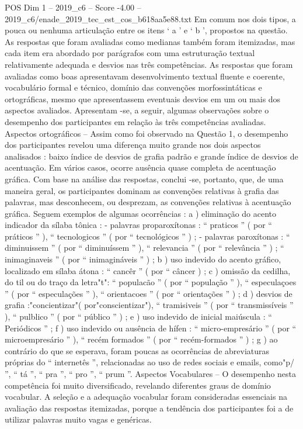 \begin{textsample}{POS Dim 1 – 2019\_c6 – Score -4.00 – 2019\_c6/enade\_2019\_tec\_est\_cos\_b618aa5e88.txt}
Em comum nos dois tipos, a pouca ou nenhuma articulação entre os itens ‘ a ’ e ‘ b ’, propostos na questão.
As respostas que foram avaliadas como medianas também foram itemizadas, mas cada item era abordado por parágrafos com uma estruturação textual relativamente adequada e desvios nas três competências.
As respostas que foram avaliadas como boas apresentavam desenvolvimento textual fluente e coerente, vocabulário formal e técnico, domínio das convenções morfossintáticas e ortográficas, mesmo que apresentassem eventuais desvios em um ou mais dos aspectos avaliados.
Apresentam -se, a seguir, algumas observações sobre o desempenho dos participantes em relação às três competências avaliadas.
Aspectos ortográficos – Assim como foi observado na Questão 1, o desempenho dos participantes revelou uma diferença muito grande nos dois aspectos analisados : baixo índice de desvios de grafia padrão e grande índice de desvios de acentuação.
Em vários casos, ocorre ausência quase completa de acentuação gráfica.
Com base na análise das respostas, conclui -se, portanto, que, de uma maneira geral, os participantes dominam as convenções relativas à grafia das palavras, mas desconhecem, ou desprezam, as convenções relativas à acentuação gráfica.
Seguem exemplos de algumas ocorrências : a ) eliminação do acento indicador da sílaba tônica : - palavras proparoxítonas : “ praticos ” ( por “ práticos ” ), “ tecnologicos ” ( por “ tecnológicos ” ) ; - palavras paroxítonas : “ diminuissem ” ( por “ diminuíssem ” ), “ relevancia ” ( por “ relevância ” ) ; “ inimaginaveis ” ( por “ inimagináveis ” ) ; b ) uso indevido do acento gráfico, localizado em sílaba átona : “ cancêr ” ( por “ câncer ) ; c ) omissão da cedilha, do til ou do traço da letra"t": “ populacão ” ( por “ população ” ), “ especulaçoes ” ( por “ especulações ” ), “ orientacoes ” ( por “ orientações ” ) ; d ) desvios de grafia :"concientizar"( por"conscientizar"), “ tramisiveis ” ( por “ transmissíveis ” ), “ pulblico ” ( por “ público ” ) ; e ) uso indevido de inicial maiúscula : “ Periódicos ” ; f ) uso indevido ou ausência de hífen : “ micro-empresário ” ( por “ microempresário ” ), “ recém formados ” ( por “ recém-formados ” ) ; g ) ao contrário do que se esperava, foram poucas as ocorrências de abreviaturas próprias do “ internetês ”, relacionadas ao uso de redes sociais e emails, como"p/ ”, “ tá ”, “ pra ”, “ pro ”, “ prum ”.
Aspectos Vocabulares – O desempenho nesta competência foi muito diversificado, revelando diferentes graus de domínio vocabular.
A seleção e a adequação vocabular foram consideradas essenciais na avaliação das respostas itemizadas, porque a tendência dos participantes foi a de utilizar palavras muito vagas e genéricas.

\end{textsample}

